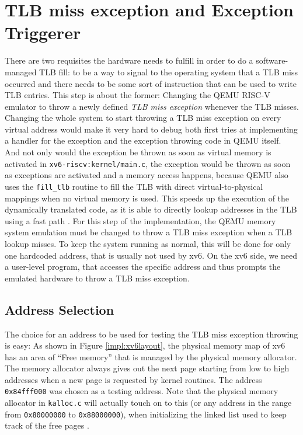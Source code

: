 \section{TLB miss exception and Exception Triggerer }
There are two requisites the hardware needs to fulfill in order to do a software-managed TLB fill:
to be a way to signal to the operating system that a TLB miss occurred and there needs to be some
sort of instruction that can be used to write TLB entries.
This step is about the former: Changing the QEMU RISC-V emulator to throw a newly defined \textit{
    TLB miss exception} whenever the TLB misses.
Changing the whole system to start throwing a TLB miss exception on every virtual address would
make it very hard to debug both first tries at implementing a handler for the exception and the
exception throwing code in QEMU itself.
And not only would the exception be thrown as soon as virtual memory is activated in
\texttt{xv6-riscv:kernel/main.c}, the exception would be thrown
as soon as exceptions are activated and a memory access happens, because QEMU also uses the
\texttt{fill\_tlb} routine to fill the TLB with direct
virtual-to-physical mappings when no virtual memory is used. This speeds up the execution of
the dynamically translated code, as it is able to directly
lookup addresses in the TLB using a fast path \cite{DeepDiveQEMU}.
For this step of the implementation, the QEMU memory system emulation must be changed to throw a
TLB miss exception when a TLB lookup misses. To keep the system running as normal, this will
be done for only one hardcoded address, that is usually not used by xv6.
On the xv6 side, we need a user-level program, that accesses the specific address and thus prompts
the emulated hardware to throw a TLB miss exception.


\subsection{Address Selection}
The choice for an address to be used for testing the TLB miss exception throwing is easy:
As shown in Figure \ref{impl:xv6layout}, the physical memory map of xv6 has an
area of ``Free memory'' that is managed by the physical memory allocator. The memory allocator
always gives out the next page starting from low to high addresses when a new page is requested
by kernel routines. The address \texttt{0x84fff000} was chosen as a testing address.
Note that the physical memory allocator in \texttt{kalloc.c} will actually touch on to this (or
any address in the range from \texttt{0x80000000} to \texttt{0x88000000}), when initializing
the linked list used to keep track of the free pages \cite{cox2011xv6}.

